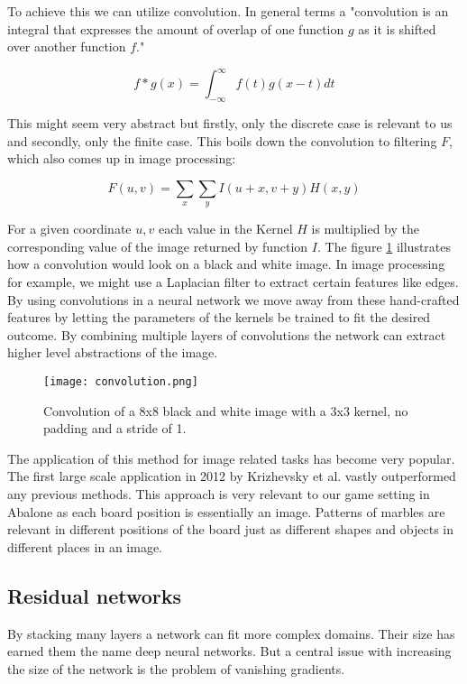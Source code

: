 To achieve this we can utilize convolution. In general terms a "convolution is an integral that expresses the amount of overlap of one function $g$ as it is shifted over another function $f$." \cite{weisstein_convolution_nodate}

$$
    f * g(x) = \int_{-\infty}^{\infty} f(t)g(x - t) dt
$$

This might seem very abstract but firstly, only the discrete case is relevant to us and secondly, only the finite case. This boils down the convolution to filtering $F$, which also comes up in image processing:

$$
    F(u, v) = \sum_{x} \sum_{y} I(u+x, v+y)H(x, y)
$$

For a given coordinate $u,v$ each value in the Kernel $H$ is multiplied by the  corresponding value of the image returned by function $I$. The figure \ref{convolution} illustrates how a convolution would look on a black and white image. In image processing for example, we might use a Laplacian filter to extract certain features like edges. By using convolutions in a neural network we move away from these hand-crafted features by letting the parameters of the kernels be trained to fit the desired outcome. By combining multiple layers of convolutions the network can extract higher level abstractions of the image. \cite{ilin_abstraction_2017}

\begin{figure}
    \centering
    \texttt{[image: convolution.png]}
    \caption{Convolution of a 8x8 black and white image with a 3x3 kernel, no padding and a stride of 1. \cite{bruasdal_deep_2020}}
    \label{convolution}
\end{figure}


The application of this method for image related tasks has become very popular. The first large scale application in 2012 by Krizhevsky et al. \cite{krizhevsky_imagenet_2017} vastly outperformed any previous methods. This approach is very relevant to our game setting in Abalone as each board position is essentially an image. Patterns of marbles are relevant in different positions of the board just as different shapes and objects in different places in an image.

\subsection{Residual networks}
By stacking many layers a network can fit more complex domains. Their size has earned them the name deep neural networks. But a central issue with increasing the size of the network is the problem of vanishing gradients.

